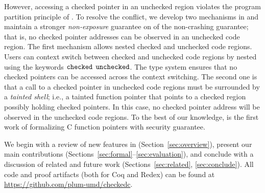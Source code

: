However, accessing a checked pointer in an unchecked region violates the program partition principle of \systemname.
To resolve the conflict, we develop two mechanisms in \systemname 
and maintain a stronger \textit{non-exposure} guarantee on of the non-crashing guarantee; 
that is, no checked pointer addresses can be observed in an unchecked code region.
The first mechanism allows nested checked and unchecked code regions.
Users can context switch between checked and unchecked code regions 
by nested using the keywords $\mathtt{checked}$ $\mathtt{unchecked}$.
The type system ensures that no checked pointers can be accessed across the context switching.
The second one is that a call to a checked pointer in unchecked code regions 
must be surrounded by a \textit{tainted shell}; 
i.e., a tainted function pointer that points to a checked region possibly holding checked pointers.
In this case, no checked pointer address will be observed in the unchecked code regions.
% 
% 
To the best of our knowledge, \systemname is the first work of formalizing C function pointers with security guarantee.


We begin with a review of \checkedc{}  new features in
\systemname (Section~\ref{sec:overview}), present our main contributions
(Sections~\ref{sec:formal}--\ref{sec:evaluation}), and conclude with a
discussion of related and future work (Sections~\ref{sec:related},
\ref{sec:conclude}). All code and proof artifacts (both for Coq and Redex) can
be found at \url{https://github.com/plum-umd/checkedc}.


